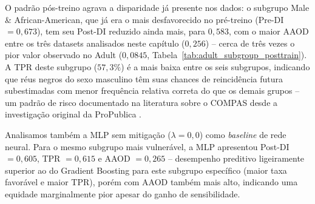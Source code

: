 \begin{table}[H]
    \centering
    \caption{Métricas de equidade interseccional pós-treino por subgrupo (COMPAS, GradientBoosting, melhor baseline), média entre 3 folds externos.}
    \vspace{2mm}
    \label{tab:compas_subgroup_posttrain}
\end{table}

O padrão pós-treino agrava a disparidade já presente nos dados: o subgrupo Male \& African-American, que já era o mais desfavorecido no pré-treino (Pre-DI $=0,673$), tem seu Post-DI reduzido ainda mais, para $0,583$, com o maior AAOD entre os três datasets analisados neste capítulo ($0,256$) -- cerca de três vezes o pior valor observado no Adult ($0,0845$, Tabela~\ref{tab:adult_subgroup_posttrain}). A TPR deste subgrupo ($57,3\%$) é a mais baixa entre os seis subgrupos, indicando que réus negros do sexo masculino têm suas chances de reincidência futura subestimadas com menor frequência relativa correta do que os demais grupos -- um padrão de risco documentado na literatura sobre o COMPAS desde a investigação original da ProPublica \citep{angwin2016machine}.

Analisamos também a MLP sem mitigação ($\lambda = 0,0$) como \textit{baseline} de rede neural. Para o mesmo subgrupo mais vulnerável, a MLP apresentou Post-DI $= 0,605$, TPR $= 0,615$ e AAOD $= 0,265$ -- desempenho preditivo ligeiramente superior ao do Gradient Boosting para este subgrupo específico (maior taxa favorável e maior TPR), porém com AAOD também mais alto, indicando uma equidade marginalmente pior apesar do ganho de sensibilidade.

